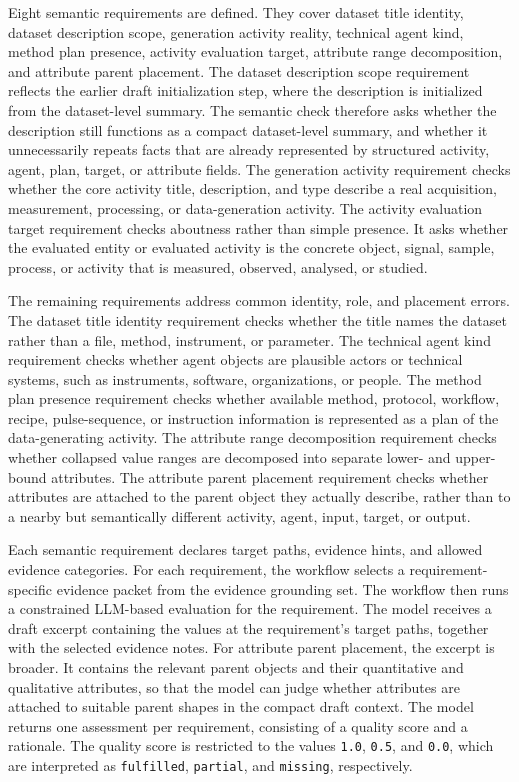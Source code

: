 Eight semantic requirements are defined.
They cover dataset title identity, dataset description scope, generation activity reality, technical agent kind, method plan presence, activity evaluation target, attribute range decomposition, and attribute parent placement.
The dataset description scope requirement reflects the earlier draft initialization step, where the description is initialized from the dataset-level summary.
The semantic check therefore asks whether the description still functions as a compact dataset-level summary, and whether it unnecessarily repeats facts that are already represented by structured activity, agent, plan, target, or attribute fields.
The generation activity requirement checks whether the core activity title, description, and type describe a real acquisition, measurement, processing, or data-generation activity.
The activity evaluation target requirement checks aboutness rather than simple presence.
It asks whether the evaluated entity or evaluated activity is the concrete object, signal, sample, process, or activity that is measured, observed, analysed, or studied.

The remaining requirements address common identity, role, and placement errors.
The dataset title identity requirement checks whether the title names the dataset rather than a file, method, instrument, or parameter.
The technical agent kind requirement checks whether agent objects are plausible actors or technical systems, such as instruments, software, organizations, or people.
The method plan presence requirement checks whether available method, protocol, workflow, recipe, pulse-sequence, or instruction information is represented as a plan of the data-generating activity.
The attribute range decomposition requirement checks whether collapsed value ranges are decomposed into separate lower- and upper-bound attributes.
The attribute parent placement requirement checks whether attributes are attached to the parent object they actually describe, rather than to a nearby but semantically different activity, agent, input, target, or output.

Each semantic requirement declares target paths, evidence hints, and allowed evidence categories.
For each requirement, the workflow selects a requirement-specific evidence packet from the evidence grounding set.
The workflow then runs a constrained \ac{LLM}-based evaluation for the requirement.
The model receives a draft excerpt containing the values at the requirement's target paths, together with the selected evidence notes.
For attribute parent placement, the excerpt is broader.
It contains the relevant parent objects and their quantitative and qualitative attributes, so that the model can judge whether attributes are attached to suitable parent shapes in the compact draft context.
The model returns one assessment per requirement, consisting of a quality score and a rationale.
The quality score is restricted to the values \texttt{1.0}, \texttt{0.5}, and \texttt{0.0}, which are interpreted as \texttt{fulfilled}, \texttt{partial}, and \texttt{missing}, respectively.

